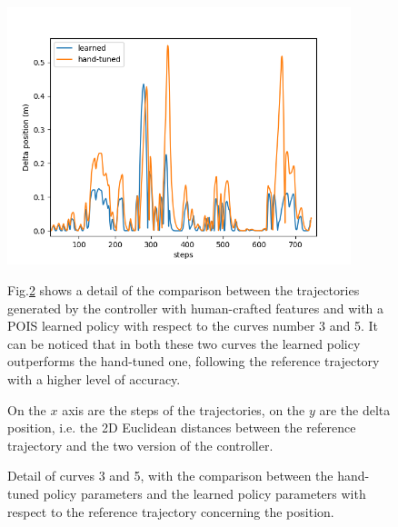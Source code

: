 \begin{figure}[H]
 \centering
  \captionsetup{width=10cm}
  \includegraphics[width=10cm]{./img/deltas_pois/delta_position}
  \caption{On the $x$ axis are the steps of the trajectories, on the $y$ are the delta position, i.e. the 2D Euclidean distances between the reference trajectory and the two version of the controller.}
   \label{fig:delta_position}
 
Fig.\ref{fig:deltaposexpl} shows a detail of the comparison between the trajectories generated by the controller with human-crafted features and with a POIS learned policy with respect to the curves number 3 and 5. It can be noticed that in both these two curves the learned policy outperforms the hand-tuned one, following the reference trajectory with a higher level of accuracy.
 
\end{figure}
\begin{figure}[H]
\centering
{}
\hspace{3mm}
\caption{Detail of curves 3 and 5, with the comparison between the hand-tuned policy parameters and the learned policy parameters with respect to the reference trajectory concerning the position.}
\label{fig:deltaposexpl}
\end{figure}

